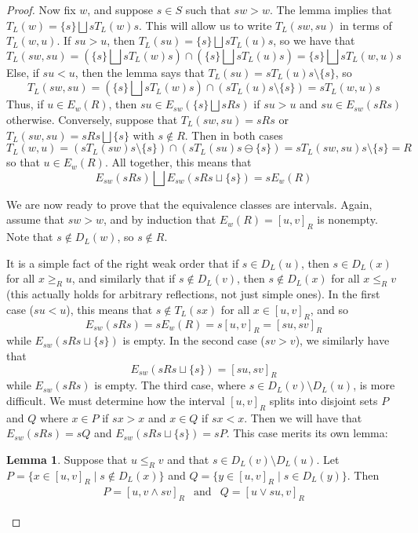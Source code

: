 \documentclass[10pt]{amsart}
\theoremstyle{definition}
\newtheorem{lemma}{Lemma}
\theoremstyle{definition}
\begin{document}
\begin{proof}
Now fix $w$, and suppose $s \in S$ such that $sw > w$. The lemma implies that $T_L(w) = \{s\} \bigsqcup sT_L(w)s$. This will allow us to write $T_L(sw, su)$ in terms of $T_L(w, u)$. If $su > u$, then $T_L(su) = \{s\} \bigsqcup sT_L(u)s$, so we have that
\[
T_L(sw, su) = (\{s\} \bigsqcup sT_L(w)s) \cap (\{s\} \bigsqcup sT_L(u)s) = \{s\} \bigsqcup sT_L(w, u)s
\]
Else, if $su < u$, then the lemma says that $T_L(su) = sT_L(u)s \setminus \{s\}$, so
\[
T_L(sw, su) = (\{s\} \bigsqcup sT_L(w)s) \cap (sT_L(u)s \setminus \{s\}) = sT_L(w, u)s
\]
Thus, if $u \in E_w(R)$, then $su \in E_{sw}(\{s\} \bigsqcup sRs)$ if $su > u$ and $su \in E_{sw}(sRs)$ otherwise. Conversely, suppose that $T_L(sw, su) = sRs$ or $T_L(sw, su) = sRs \bigsqcup \{s\}$ with $s \notin R$. Then in both cases
\[
T_L(w, u) = (sT_L(sw)s \setminus \{s\}) \cap (sT_L(su)s \ominus \{s\}) = sT_L(sw, su)s \setminus \{s\} = R
\]
so that $u \in E_w(R)$. All together, this means that
\begin{equation}\label{split}
E_{sw}(sRs) \bigsqcup E_{sw}(sRs \sqcup \{s\}) = sE_w(R)
\end{equation}

We are now ready to prove that the equivalence classes are intervals. Again, assume that $sw > w$, and by induction that $E_w(R) = [u, v]_R$ is nonempty. Note that $s \notin D_L(w)$, so $s \notin R$.

It is a simple fact of the right weak order that if $s \in D_L(u)$, then $s \in D_L(x)$ for all $x \geq_R u$, and similarly that if $s \notin D_L(v)$, then $s \notin D_L(x)$ for all $x \leq_R v$ (this actually holds for arbitrary reflections, not just simple ones). In the first case ($su < u$), this means that $s \notin T_L(sx)$ for all $x \in [u, v]_R$, and so
\[
E_{sw}(sRs) = sE_w(R) = s[u, v]_R = [su, sv]_R
\]
while $E_{sw}(sRs \sqcup \{s\})$ is empty. In the second case ($sv > v$), we similarly have that
\[
E_{sw}(sRs \sqcup \{s\}) = [su, sv]_R
\]
while $E_{sw}(sRs)$ is empty. The third case, where $s \in D_L(v) \setminus D_L(u)$, is more difficult. We must determine how the interval $[u, v]_R$ splits into disjoint sets $P$ and $Q$ where $x \in P$ if $sx > x$ and $x \in Q$ if $sx < x$. Then we will have that $E_{sw}(sRs) = sQ$ and $E_{sw}(sRs \sqcup \{s\}) = sP$. This case merits its own lemma:

\begin{lemma}
\label{ldescent}
Suppose that $u \leq_R v$ and that $s \in D_L(v) \setminus D_L(u)$. Let $P = \{x \in [u, v]_R \mid s \notin D_L(x)\}$ and $Q = \{y \in [u, v]_R \mid s \in D_L(y)\}$. Then
\[
\begin{array}{lcr}
P = [u, v \land sv]_R & \text{and} & Q = [u \lor su, v]_R
\end{array}
\]
\end{lemma}


\end{proof}
\end{document}

